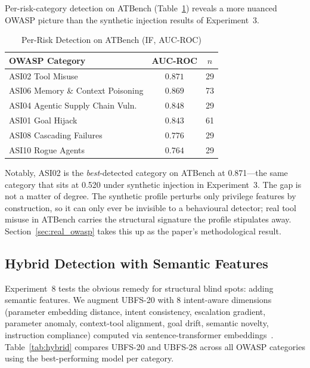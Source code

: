 \documentclass[conference]{IEEEtran}
\begin{document}
Per-risk-category detection on ATBench (Table~\ref{tab:mcp_risk}) reveals a more nuanced OWASP picture than the synthetic injection results of Experiment~3.

\begin{table}[htbp]
\caption{Per-Risk Detection on ATBench (IF, AUC-ROC)}
\label{tab:mcp_risk}
\centering
\begin{tabular}{lcc}
\toprule
\textbf{OWASP Category} & \textbf{AUC-ROC} & \textbf{$n$} \\
\midrule
ASI02 Tool Misuse & $0.871$ & 29 \\
ASI06 Memory \& Context Poisoning & $0.869$ & 73 \\
ASI04 Agentic Supply Chain Vuln. & $0.848$ & 29 \\
ASI01 Goal Hijack & $0.843$ & 61 \\
ASI08 Cascading Failures & $0.776$ & 29 \\
ASI10 Rogue Agents & $0.764$ & 29 \\
\bottomrule
\end{tabular}
\end{table}

Notably, ASI02 is the \emph{best}-detected category on ATBench at 0.871---the same category that sits at 0.520 under synthetic injection in Experiment~3. The gap is not a matter of degree. The synthetic profile perturbs only privilege features by construction, so it can only ever be invisible to a behavioural detector; real tool misuse in ATBench carries the structural signature the profile stipulates away. Section~\ref{sec:real_owasp} takes this up as the paper's methodological result.

\subsection{Hybrid Detection with Semantic Features}
\label{sec:hybrid}

Experiment~8 tests the obvious remedy for structural blind spots: adding semantic features. We augment UBFS-20 with 8 intent-aware dimensions (parameter embedding distance, intent consistency, escalation gradient, parameter anomaly, context-tool alignment, goal drift, semantic novelty, instruction compliance) computed via sentence-transformer embeddings~\cite{reimers2019sentbert}. Table~\ref{tab:hybrid} compares UBFS-20 and UBFS-28 across all OWASP categories using the best-performing model per category.
\end{document}
